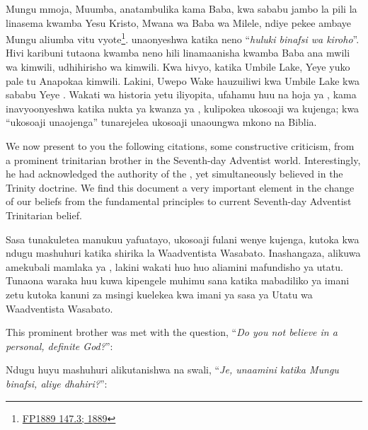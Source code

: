 Mungu mmoja, Muumba, anatambulika kama Baba, kwa sababu jambo la pili la  linasema kwamba Yesu Kristo, Mwana wa Baba wa Milele, ndiye pekee ambaye Mungu aliumba vitu vyote\footnote{\href{https://egwwritings.org/?ref=en_FP1889.147.3&para=931.7}{FP1889 147.3; 1889}}.  unaonyeshwa katika neno “\textit{huluki binafsi wa kiroho}”. Hivi karibuni tutaona kwamba neno hili linamaanisha kwamba Baba ana mwili wa kimwili, udhihirisho wa kimwili. Kwa hivyo, katika Umbile Lake, Yeye yuko pale tu Anapokaa kimwili. Lakini, Uwepo Wake hauzuiliwi kwa Umbile Lake kwa sababu Yeye . Wakati wa historia yetu iliyopita, ufahamu huu na hoja ya , kama inavyoonyeshwa katika nukta ya kwanza ya , kulipokea ukosoaji wa kujenga; kwa “ukosoaji unaojenga” tunarejelea ukosoaji unaoungwa mkono na Biblia.


We now present to you the following citations, some constructive criticism, from a prominent trinitarian brother in the Seventh-day Adventist world. Interestingly, he had acknowledged the authority of the , yet simultaneously believed in the Trinity doctrine. We find this document a very important element in the change of our beliefs from the fundamental principles to current Seventh-day Adventist Trinitarian belief.


Sasa tunakuletea manukuu yafuatayo, ukosoaji fulani wenye kujenga, kutoka kwa ndugu mashuhuri katika shirika la Waadventista Wasabato. Inashangaza, alikuwa amekubali mamlaka ya , lakini wakati huo huo aliamini mafundisho ya utatu. Tunaona waraka huu kuwa kipengele muhimu sana katika mabadiliko ya imani zetu kutoka kanuni za msingi kuelekea kwa imani ya sasa ya Utatu wa Waadventista Wasabato.


This prominent brother was met with the question, “\textit{Do you not believe in a personal, definite God?}”:


Ndugu huyu mashuhuri alikutanishwa na swali, “\textit{Je, unaamini katika Mungu binafsi, aliye dhahiri?}”:




